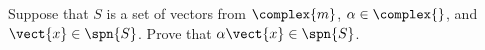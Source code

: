 Suppose that $S$ is a set of vectors from $\complex{m}$, $\alpha\in\complex{\null}$, and $\vect{x}\in\spn{S}$.  Prove that $\alpha\vect{x}\in\spn{S}$.
